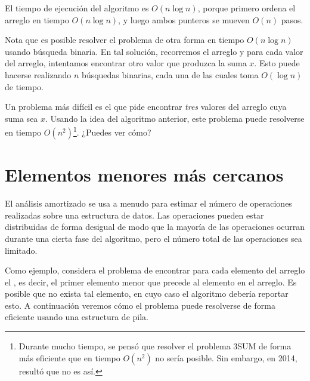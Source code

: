 \begin{center}
\end{center}

El tiempo de ejecución del algoritmo es
$O(n \log n)$, porque primero ordena
el arreglo en tiempo $O(n \log n)$,
y luego ambos punteros se mueven $O(n)$ pasos.

Nota que es posible resolver el problema
de otra forma en tiempo $O(n \log n)$ usando búsqueda binaria.
En tal solución, recorremos el arreglo
y para cada valor del arreglo, intentamos encontrar otro
valor que produzca la suma $x$.
Esto puede hacerse realizando $n$ búsquedas binarias,
cada una de las cuales toma $O(\log n)$ de tiempo.

Un problema más difícil es
el  que pide
encontrar \emph{tres} valores del arreglo
cuya suma sea $x$.
Usando la idea del algoritmo anterior,
este problema puede resolverse en tiempo $O(n^2)$\footnote{Durante mucho tiempo,
se pensó que resolver
el problema 3SUM de forma más eficiente que en tiempo $O(n^2)$
no sería posible.
Sin embargo, en 2014, resultó \cite{gro14}
que no es así.}.
¿Puedes ver cómo?

\section{Elementos menores más cercanos}


El análisis amortizado se usa a menudo para
estimar el número de operaciones
realizadas sobre una estructura de datos.
Las operaciones pueden estar distribuidas de forma desigual de modo
que la mayoría de las operaciones ocurran durante una
cierta fase del algoritmo, pero el número total
de las operaciones sea limitado.

Como ejemplo, considera el problema
de encontrar para cada elemento del arreglo
el , es decir,
el primer elemento menor que precede al elemento
en el arreglo.
Es posible que no exista tal elemento,
en cuyo caso el algoritmo debería reportar esto.
A continuación veremos cómo el problema puede
resolverse de forma eficiente usando una estructura de pila.

